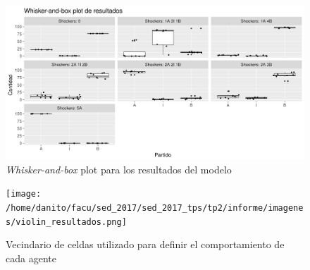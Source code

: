 \begin{figure}[!h]
\centering
\includegraphics[scale=0.5]{imagenes/histograma_resultados.png}
    \caption{\textit{Whisker-and-box} plot para los resultados del modelo}
\label{fig:modelo_shock_box}
\end{figure}

\begin{figure}[!h]
\centering
\texttt{[image: /home/danito/facu/sed\_2017/sed\_2017\_tps/tp2/informe/imagenes/violin\_resultados.png]}
\caption{Vecindario de celdas utilizado para definir el comportamiento de cada agente}
\label{fig:modelo_shock_violin}
\end{figure}


